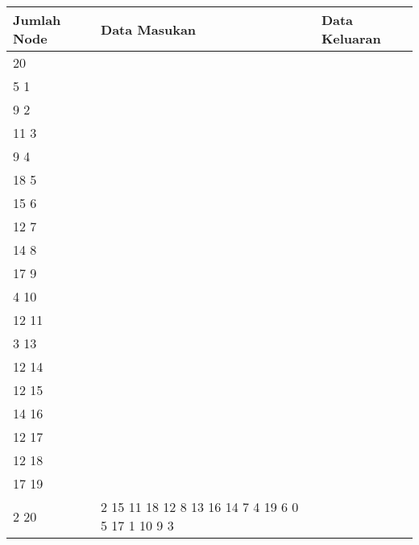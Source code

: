 	\begin{longtable}[Ht]{| p{} | p{} | p{} |}
		\hline
		Jumlah Node & Data Masukan                                                                                                                                                                                                                          & Data Keluaran                                                          \\ \hline
	20          & \begin{tabular}[c]{@{}l@{}}20\\ 5 1\\ 9 2\\ 11 3\\ 9 4\\ 18 5\\ 15 6\\ 12 7\\ 14 8\\ 17 9\\ 4 10\\ 12 11\\ 3 13\\ 12 14\\ 12 15\\ 14 16\\ 12 17\\ 12 18\\ 17 19\\ 2 20\end{tabular}                                                   & 2 15 11 18 12 8 13 16 14 7 4 19 6 0 5 17 1 10 9 3                      \\ \hline
	\end{longtable}
	\pagebreak
